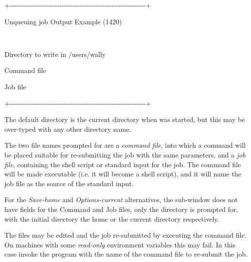 \begin{exparasmall}

+-{}-{}-{}-{}-{}-{}-{}-{}-{}-{}-{}-{}-{}-{}-{}-{}-{}-{}-{}-{}-{}-{}-{}-{}-{}-{}-{}-{}-{}-{}-{}-{}-{}-{}-{}-{}-{}-{}-{}-{}-{}-{}-{}-{}-{}-{}-{}-{}-{}-{}-{}-{}-{}-{}-{}-{}-{}-{}-{}-+

{\textbar}Unqueuing job {\textasciigrave}Output
Example{\textquotesingle} (1420)
\ \ \ \ \ \ \ \ \ \ \ \ \ \ \ \ \ \ \ \ \ \ {\textbar}

{\textbar}
\ \ \ \ \ \ \ \ \ \ \ \ \ \ \ \ \ \ \ \ \ \ \ \ \ \ \ \ \ \ \ \ \ \ \ \ \ \ \ \ \ \ \ \ \ \ \ \ \ \ \ \ \ \ \ \ \ \ \ {\textbar}

{\textbar}Directory to write in /users/wally
\ \ \ \ \ \ \ \ \ \ \ \ \ \ \ \ \ \ \ \ \ \ \ \ \ {\textbar}

{\textbar}Command file
\ \ \ \ \ \ \ \ \ \ \ \ \ \ \ \ \ \ \ \ \ \ \ \ \ \ \ \ \ \ \ \ \ \ \ \ \ \ \ \ \ \ \ \ \ \ \ {\textbar}

{\textbar}Job file
\ \ \ \ \ \ \ \ \ \ \ \ \ \ \ \ \ \ \ \ \ \ \ \ \ \ \ \ \ \ \ \ \ \ \ \ \ \ \ \ \ \ \ \ \ \ \ \ \ \ \ {\textbar}

+-{}-{}-{}-{}-{}-{}-{}-{}-{}-{}-{}-{}-{}-{}-{}-{}-{}-{}-{}-{}-{}-{}-{}-{}-{}-{}-{}-{}-{}-{}-{}-{}-{}-{}-{}-{}-{}-{}-{}-{}-{}-{}-{}-{}-{}-{}-{}-{}-{}-{}-{}-{}-{}-{}-{}-{}-{}-{}-{}-+

\end{exparasmall}

The default directory is the current directory when \PrBtq{} was started, but this may be over-typed with
any other directory name.

The two file names prompted for are a \textit{command file}, into which
a \PrBtr{} command will be placed suitable for
re-submitting the job with the same parameters, and a \textit{job
file}, containing the shell script or standard input for the job. The
command file will be made executable (i.e. it will become a shell
script), and it will name the job file as the source of the standard
input.

For the \textit{Save-home} and \textit{Options-current} alternatives,
the sub-window does not have fields for the Command and Job files, only
the directory is prompted for, with the initial directory the home or
the current directory respectively.

The files may be edited and the job re-submitted by executing the
command file. On machines with some \textit{read-only} environment
variables this may fail. In this case invoke the program
 with the name of the command file to
re-submit the job.

